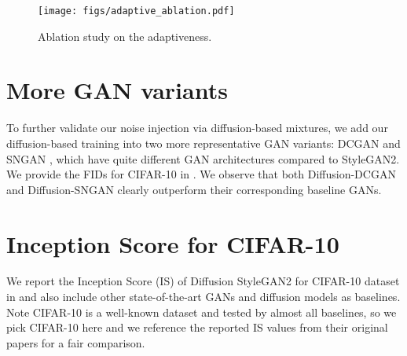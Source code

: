 \documentclass{article} \usepackage{iclr2023_conference,times}
\theoremstyle{plain}
\theoremstyle{definition}
\theoremstyle{remark}
\begin{document}
\begin{figure}
    \centering
    \texttt{[image: figs/adaptive\_ablation.pdf]}
    \caption{Ablation study on the  adaptiveness.}
    \label{fig:adaptive_ablation}
\end{figure}

\section{More GAN variants}

To further validate our noise injection via diffusion-based mixtures, we add our diffusion-based training into two more representative GAN variants: DCGAN \citep{radford2015unsupervised} and SNGAN \citep{miyato2018spectral}, which have quite different GAN architectures compared to StyleGAN2. We provide the FIDs for CIFAR-10 in . We observe that both Diffusion-DCGAN and Diffusion-SNGAN clearly outperform their corresponding baseline GANs.


\begin{table}[H]
\caption{ FIDs on CIFAR-10 for DCGAN, Diffusion-DCGAN, SNGAN, and Diffusion-SNGAN. }
    \centering
    \label{tab:more_gan_variants}
\end{table}

\section{{Inception Score for CIFAR-10}}


{
We report the Inception Score (IS) \citep{salimans2016improved} of Diffusion StyleGAN2 for CIFAR-10 dataset in  and also include other state-of-the-art GANs and diffusion models as baselines. Note CIFAR-10 is a well-known dataset and tested by almost all baselines, so we pick CIFAR-10 here and we reference the reported IS values from their original papers for a fair comparison.}
\end{document}
